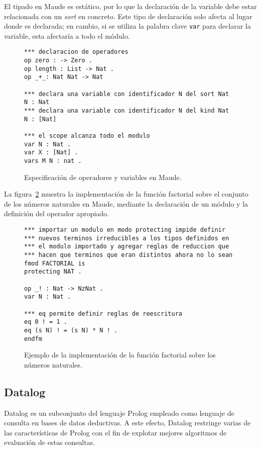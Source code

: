 \documentclass[11pt,captions=nooneline,DIV=14, parskip=full]{scrartcl}
\begin{document}
El tipado en Maude es estático, por lo que la declaración de la variable debe estar relacionada con un \textit{sort} en concreto. Este tipo de declaración solo afecta al lugar donde es declarada; en cambio, si se utiliza la palabra clave \texttt{var} para declarar la variable, esta afectaría a todo el módulo.

\begin{figure}[!htbp]
\begin{lstlisting}[frame=single]
*** declaracion de operadores
op zero : -> Zero .
op length : List -> Nat .
op _+_: Nat Nat -> Nat

*** declara una variable con identificador N del sort Nat
N : Nat
*** declara una variable con identificador N del kind Nat
N : [Nat]

*** el scope alcanza todo el modulo
var N : Nat .
var X : [Nat] .
vars M N : nat .
\end{lstlisting} 
\caption{Especificación de operadores y variables en Maude.}
\label{fig:maudesyntax2}
\end{figure}

La figura~\ref{fig:maudefact} muestra la implementación de la función factorial sobre el conjunto de los números naturales en Maude, mediante la declaración de un módulo y la definición del operador apropiado.

\begin{figure}[!htbp]
\begin{lstlisting}[frame=single]
*** importar un modulo en modo protecting impide definir
*** nuevos terminos irreducibles a los tipos definidos en
*** el modulo importado y agregar reglas de reduccion que
*** hacen que terminos que eran distintos ahora no lo sean
fmod FACTORIAL is 
protecting NAT .

op _! : Nat -> NzNat .
var N : Nat .

*** eq permite definir reglas de reescritura
eq 0 ! = 1 .
eq (s N) ! = (s N) * N ! .
endfm
\end{lstlisting} 
\caption{Ejemplo de la implementación de la función factorial sobre los números naturales.}
\label{fig:maudefact}
\end{figure}

\subsection{Datalog}
Datalog es un subconjunto del lenguaje Prolog empleado como lenguaje de consulta en bases de datos deductivas. A este efecto, Datalog restringe varias de las características de Prolog con el fin de explotar mejores algoritmos de evaluación de estas consultas.
\end{document}
